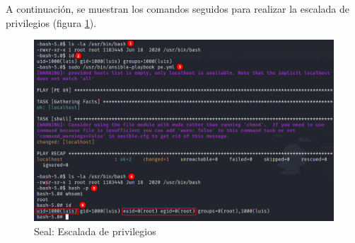 A continuación, se muestran los comandos seguidos para realizar la escalada de privilegios (figura \ref{fig:seal-escalada-priv}).\\
\begin{figure}[h]
    \centering
    \includegraphics[width=1.0\textwidth]{images/machines/seal/obtencion-root.png}
    \caption{Seal: Escalada de privilegios}
    \label{fig:seal-escalada-priv}
\end{figure}

